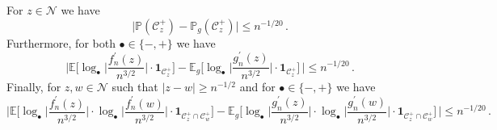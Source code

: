 \documentclass[10pt,a4paper]{amsart}
\newcommand{\bE}{\mathbb E}
\newcommand{\bP}{\mathbb P}
\newcommand{\cC}{\mathcal C}
\newcommand{\cN}{\mathcal N}
\newcommand{\one}{\boldsymbol{1}}
\begin{document}
    \begin{lemma}
        \label{lemma:comparison_with_a_gaussian_on_the_event_C_pm}
        For $z\in \cN$ we have
        \begin{equation}
        \label{eq:lemma_comparison_with_a_gaussian_on_the_event_C_pm_first}
            \Big| \bP(\cC_z^+) - \bP_g(\cC_z^+) \Big| \le n^{-1/20} \, .
        \end{equation}
        Furthermore, for both $\bullet\in\{-,+\}$ we have
        \begin{equation}
        \label{eq:lemma_comparison_with_a_gaussian_on_the_event_C_pm_second}
            \bigg| \bE\Big[ \log_\bullet \Big|\frac{f_n^\prime(z)}{n^{3/2}}\Big| \cdot \one_{\cC_z^+} \Big]  - \bE_g\Big[ \log_\bullet \Big|\frac{g_n^\prime(z)}{n^{3/2}}\Big| \cdot \one_{\cC_z^+} \Big] \, \bigg|\le n^{-1/20} \, .
        \end{equation}
        Finally, for $z,w\in \cN$ such that $|z-w|\ge n^{-1/2}$ and for $\bullet\in\{-,+\}$ we have
        \begin{equation}
        \label{eq:lemma_comparison_with_a_gaussian_on_the_event_C_pm_third}
            \bigg| \bE\Big[ \log_\bullet \Big|\frac{f_n^\prime(z)}{n^{3/2}}\Big| \cdot \log_\bullet \Big|\frac{f_n^\prime(w)}{n^{3/2}}\Big| \cdot \one_{\cC_z^+\cap \cC_w^{+}} \Big]  - \bE_g\Big[ \log_\bullet \Big|\frac{g_n^\prime(z)}{n^{3/2}}\Big| \cdot \log_\bullet \Big|\frac{g_n^\prime(w)}{n^{3/2}}\Big| \cdot \one_{\cC_z^+\cap \cC_w^{+}} \Big] \, \bigg|\le n^{-1/20} \, .
        \end{equation}
    \end{lemma}
\end{document}
